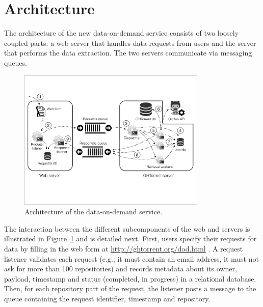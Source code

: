 
\section{Architecture}
\label{sec:arch}

The architecture of the new \ght data-on-demand service consists of two loosely coupled parts:
a web server that handles data requests from users and the \ght server that performs the data extraction.
The two servers communicate via messaging queues.

\begin{figure}[t]
\begin{center}
\includegraphics[width=0.8\textwidth, trim=5 160 5 105, clip=True]{figures/architecture.pdf}
\caption{Architecture of the \ght data-on-demand service.}
\label{fig:architecture}
\end{center}
\end{figure}

The interaction between the different subcomponents of the web and \ght servers is illustrated in
Figure~\ref{fig:architecture} and is detailed next.
First, users specify their requests for data by filling in the web form at \url{http://ghtorrent.org/dod.html} .
A request listener validates each request (e.g., it must contain an email address, it must not ask for
more than 100 repositories)
and records metadata about its owner, payload, 
timestamp and status (completed, in progress) in
a relational database.
Then, for each \gh repository part of the request, the listener posts a message to the queue 
containing the request identifier, timestamp and repository.

